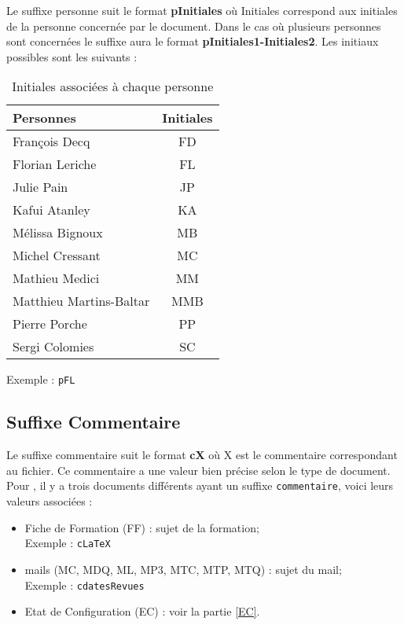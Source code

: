 Le suffixe personne suit le format \textbf{pInitiales} où Initiales correspond aux initiales de la personne concernée par le document. Dans le cas où plusieurs personnes sont concernées le suffixe aura le format \textbf{pInitiales1-Initiales2}. Les initiaux possibles sont les suivants :
\begin{table}[H]
	\centering
	\begin{tabularx}{8cm}{|X|c|}
	\hline
	\rowcolor[gray]{0.85} Personnes & Initiales\\
	\hline
	François Decq & FD \\
	\hline
	Florian Leriche & FL \\
	\hline
	Julie Pain & JP \\
	\hline
	Kafui Atanley & KA \\
	\hline
	Mélissa Bignoux & MB \\
	\hline
	Michel Cressant & MC \\
	\hline
	Mathieu Medici & MM \\
	\hline
	Matthieu Martins-Baltar & MMB \\
	\hline
	Pierre Porche & PP \\
	\hline
	Sergi Colomies & SC \\
	\hline
	\end{tabularx}
	\caption{Initiales associées à chaque personne}
	\label{Initiales}
\end{table}

Exemple : \verb+pFL+

\subsection{Suffixe Commentaire}
\label{suffixe_commentaire}

Le suffixe commentaire suit le format \textbf{cX} où X est le commentaire correspondant au fichier. Ce commentaire a une valeur bien précise selon le type de document. Pour \nomEquipe, il y a trois documents différents ayant un suffixe \verb+commentaire+, voici leurs valeurs associées :
\begin{itemize}
\item Fiche de Formation (FF) : sujet de la formation;\\
 Exemple : \verb+cLaTeX+
\item mails (MC, MDQ, ML, MP3, MTC, MTP, MTQ) : sujet du mail;\\
 Exemple : \verb+cdatesRevues+
\item Etat de Configuration (EC) : voir la partie \ref{EC}.
\end{itemize}
